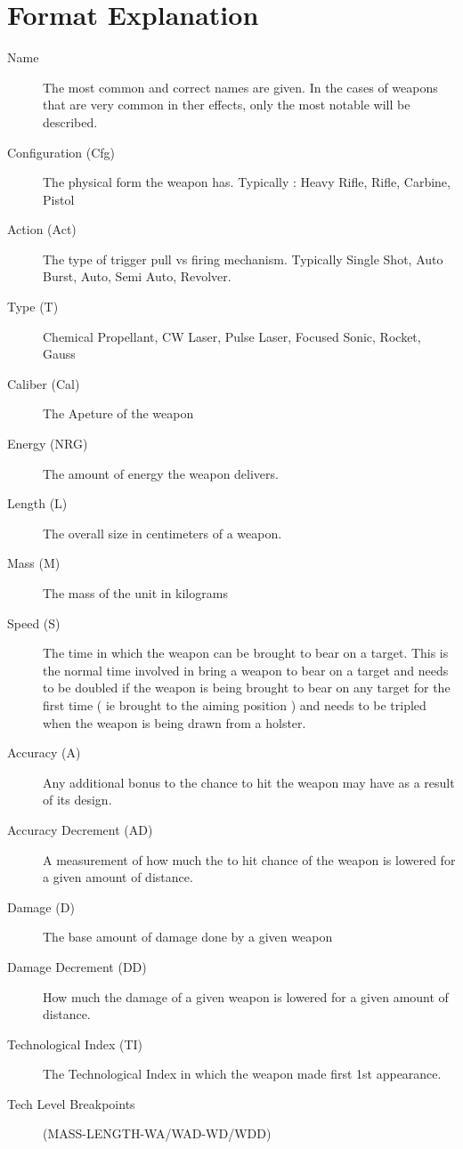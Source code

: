 \section{Format Explanation}

\begin{description}
	\item[Name]
	The most common and correct names are given. In the cases of weapons
	that are very common in ther effects, only the most notable will be
	described.
	\item[Configuration (Cfg)]
	The physical form the weapon has. Typically : Heavy Rifle, Rifle, 
	Carbine, Pistol 
	\item[Action (Act)]
	The type of trigger pull vs firing mechanism. Typically Single Shot, Auto Burst,
	Auto, Semi Auto, Revolver.
	\item[Type (T)]
	Chemical Propellant, CW Laser, Pulse Laser, Focused Sonic, Rocket, Gauss
	\item[Caliber (Cal)]
	The Apeture of the weapon
	\item[Energy (NRG)]
	The amount of energy the weapon delivers.
	\item[Length (L)]
	The overall size in centimeters of a weapon.
	\item[Mass (M)]
	The mass of the unit in kilograms
	\item[Speed (S)]
	The time in which the weapon can be brought to bear on a target. This is
	the normal time involved in bring a weapon to bear on a target and needs
	to be doubled if the weapon is being brought to bear on any target for
	the first time ( ie brought to the aiming position ) and needs to be tripled
	when the weapon is being drawn from a holster.
	\item[Accuracy (A)]
	Any ad\-di\-tional bonus to the chance to hit the weapon may have as a
	result of its design.
	\item[Accuracy Decrement (AD)]
	A measurement of how much the to hit chance of the weapon is lowered for
	a given amount of distance.
	\item[Damage (D)]
	The base amount of dam\-age done by a given weapon
	\item[Damage Decrement  (DD)]
	How much the damage of a given weapon is lowered for a given amount of
	distance.
	\item[Technological Index (TI)]
	The Technological Index in which the weapon made first 1st appearance.
	\item[Tech Level Breakpoints]
	(MASS-LENGTH-WA/WAD-WD/WDD)
\end{description}


